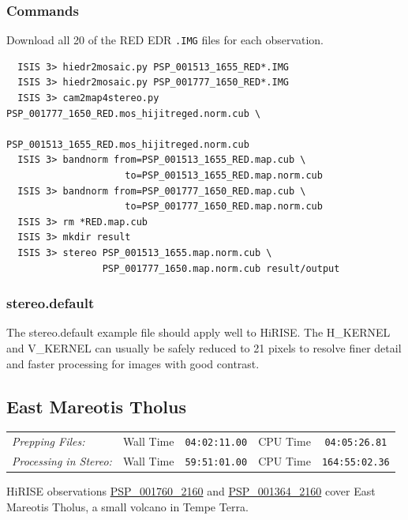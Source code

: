 \subsubsection*{Commands}

Download all 20 of the RED EDR \texttt{.IMG} files for each observation.
\begin{verbatim}
  ISIS 3> hiedr2mosaic.py PSP_001513_1655_RED*.IMG
  ISIS 3> hiedr2mosaic.py PSP_001777_1650_RED*.IMG
  ISIS 3> cam2map4stereo.py PSP_001777_1650_RED.mos_hijitreged.norm.cub \
                            PSP_001513_1655_RED.mos_hijitreged.norm.cub
  ISIS 3> bandnorm from=PSP_001513_1655_RED.map.cub \
                     to=PSP_001513_1655_RED.map.norm.cub
  ISIS 3> bandnorm from=PSP_001777_1650_RED.map.cub \
                     to=PSP_001777_1650_RED.map.norm.cub
  ISIS 3> rm *RED.map.cub
  ISIS 3> mkdir result
  ISIS 3> stereo PSP_001513_1655.map.norm.cub \
                 PSP_001777_1650.map.norm.cub result/output
\end{verbatim}

\subsubsection*{stereo.default}

The stereo.default example file should apply well to HiRISE. The
H\_KERNEL and V\_KERNEL can usually be safely reduced to 21 pixels to
resolve finer detail and faster processing for images with good
contrast.

\clearpage
\subsection{East Mareotis Tholus}

\begin{tabular}{l r c r c}
\textit{Prepping Files:}       & Wall Time & \texttt{04:02:11.00} & CPU Time & \texttt{04:05:26.81} \\
\textit{Processing in Stereo:} & Wall Time & \texttt{59:51:01.00} & CPU Time & \texttt{164:55:02.36} \\
\end{tabular}

\ac{HiRISE} observations
\href{http://hirise.lpl.arizona.edu/PSP_001760_2160}{PSP\_001760\_2160} and
\href{http://hirise.lpl.arizona.edu/PSP_001364_2160}{PSP\_001364\_2160} 
cover East Mareotis Tholus, a small volcano in Tempe Terra.

